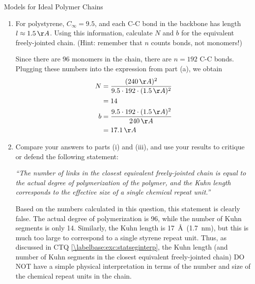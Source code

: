 \begin{activity}{Models for Ideal Polymer Chains}
\begin{exercises}
\begin{enumerate}
\begin{enumerate}
					\item For polystyrene, $C_\infty=9.5$, and each C-C bond in the backbone has length $l\approx 1.5\,\AA$.  Using this information, calculate $N$ and $b$ for the equivalent freely-jointed chain. (Hint: remember that $n$ counts bonds, not monomers!)
				
				\begin{solution}{}
					Since there are 96 monomers in the chain, there are $n=192$ C-C bonds.  Plugging these numbers into the expression from part (a), we obtain
					\begin{align*}
						N &= \frac{(240\,\AA)^2}{9.5\cdot 192\cdot(1.5\,\AA)^2}\\
							&= 14\\
						b &= \frac{9.5\cdot 192 \cdot (1.5\,\AA)^2}{240\,\AA}\\
						&= 17.1\,\AA
					\end{align*}
				\end{solution}
				
				\item Compare your answers to parts (i) and (iii), and use your results to critique or defend the following statement:
				
					\emph{``The number of links in the closest equivalent freely-jointed chain is equal to the actual degree of polymerization of the polymer, and the Kuhn length corresponds to the effective size of a single chemical repeat unit.''}
				
				\begin{solution}{}
					Based on the numbers calculated in this question, this statement is clearly false.  The actual degree of polymerization is 96, while the number of Kuhn segments is only 14.  Similarly, the Kuhn length is 17~\AA\ (1.7~nm), but this is much too large to correspond to a single styrene repeat unit.  Thus, as discussed in CTQ \ref{\labelbase:exc:statseginterp}, the Kuhn length (and number of Kuhn segments in the closest equivalent freely-jointed chain) DO NOT have a simple physical interpretation in terms of the number and size of the chemical repeat units in the chain.
				\end{solution}
				
				\end{enumerate}
		\end{enumerate}
		
\end{exercises}
	
\end{activity}